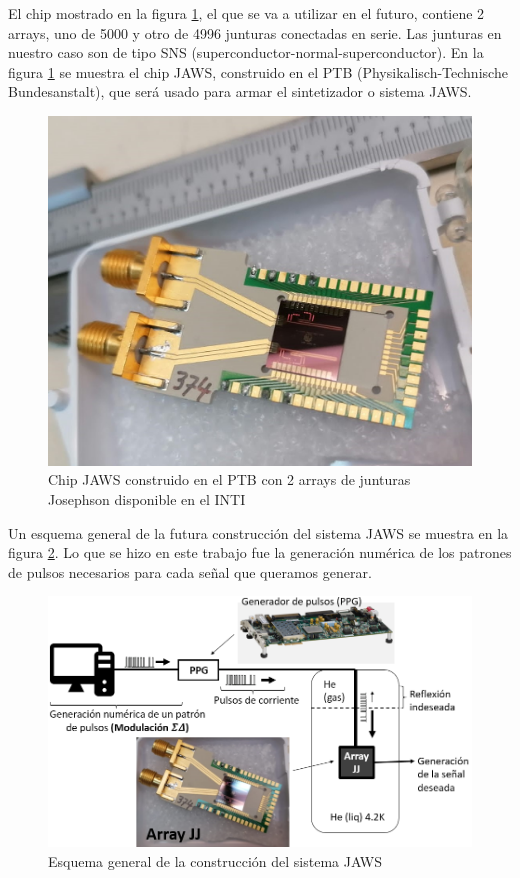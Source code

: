 \documentclass[twoside]{article}
\begin{document}
\begin{multicols}{2}
El chip mostrado en la figura \ref{fig:chipJaws}, el que se va a utilizar en el futuro, contiene 2 arrays, uno de 5000 y otro de 4996 junturas conectadas en serie. Las junturas en nuestro caso son de tipo SNS (superconductor-normal-superconductor). En la figura \ref{fig:chipJaws} se muestra el chip JAWS, construido en el PTB (Physikalisch-Technische Bundesanstalt), que será usado para armar el sintetizador o sistema JAWS. \cite{kieler2009} \cite{kohlmann2009}

\begin{figure}[H]
\centering
\includegraphics[width=0.75\linewidth]{figuras/jaws.jpg}
\caption{Chip JAWS construido en el PTB con 2 arrays de junturas Josephson disponible en el INTI}
\label{fig:chipJaws}
\end{figure}

Un esquema general de la futura construcción del sistema JAWS se muestra en la figura \ref{fig:esquemaJaws}. Lo que se hizo en este trabajo fue la generación numérica de los patrones de pulsos necesarios para cada señal que queramos generar.

\begin{figure}[H]
\centering
\includegraphics[width=\linewidth]{figuras/esquema_contruccion.png}
\caption{Esquema general de la construcción del sistema JAWS}
\label{fig:esquemaJaws}
\end{figure}


\end{multicols}
\end{document}
